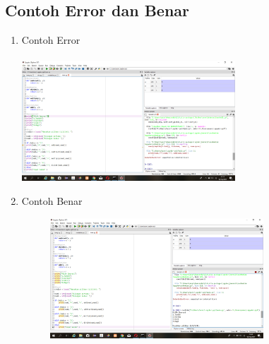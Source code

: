 \documentclass{article}
\begin{document}
\subsection{Contoh Error dan Benar}
\begin{enumerate}
    \item Contoh Error
    \paragraph{}
        \centerline{\includegraphics[width=8cm]{image/error.png}}
    \item Contoh Benar
    \begin{figure}[h]
            \centerline{\includegraphics[width=8cm]{image/contohbenar.png}}
        \end{figure}
\end{enumerate}
\end{document}
